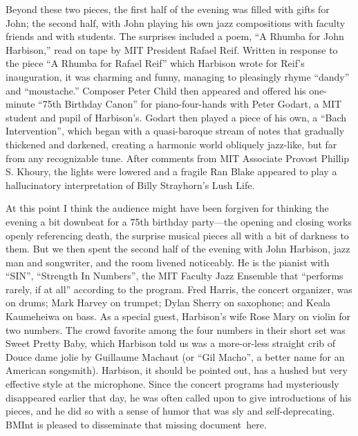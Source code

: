 Beyond these two pieces, the first half of the evening was filled with gifts for John; the second half, with John playing his own jazz compositions with faculty friends and with students. The surprises included a poem, “A Rhumba for John Harbison,” read on tape by MIT President Rafael Reif. Written in response to the piece “A Rhumba for Rafael Reif” which Harbison wrote for Reif’s inauguration, it was charming and funny, managing to pleasingly rhyme “dandy” and “moustache.” Composer Peter Child then appeared and offered his one-minute “75th Birthday Canon” for piano-four-hands with Peter Godart, a MIT student and pupil of Harbison’s. Godart then played a piece of his own, a “Bach Intervention”, which began with a quasi-baroque stream of notes that gradually thickened and darkened, creating a harmonic world obliquely jazz-like, but far from any recognizable tune. After comments from MIT Associate Provost Phillip S. Khoury, the lights were lowered and a fragile Ran Blake appeared to play a hallucinatory interpretation of Billy Strayhorn’s Lush Life.

At this point I think the audience might have been forgiven for thinking the evening a bit downbeat for a 75th birthday party—the opening and closing works openly referencing death, the surprise musical pieces all with a bit of darkness to them. But we then spent the second half of the evening with John Harbison, jazz man and songwriter, and the room livened noticeably. He is the pianist with “SIN”, “Strength In Numbers”, the MIT Faculty Jazz Ensemble that “performs rarely, if at all” according to the program. Fred Harris, the concert organizer, was on drums; Mark Harvey on trumpet; Dylan Sherry on saxophone; and Keala Kaumeheiwa on bass. As a special guest, Harbison’s wife Rose Mary on violin for two numbers. The crowd favorite among the four numbers in their short set was Sweet Pretty Baby, which Harbison told us was a more-or-less straight crib of Douce dame jolie by Guillaume Machaut (or “Gil Macho”, a better name for an American songsmith). Harbison, it should be pointed out, has a hushed but very effective style at the microphone. Since the concert programs had mysteriously disappeared earlier that day, he was often called upon to give introductions of his pieces, and he did so with a sense of humor that was sly and self-deprecating. BMInt is pleased to disseminate that missing document here.

